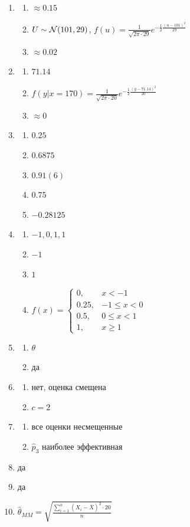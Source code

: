 \begin{enumerate}
\item
\begin{enumerate}
\item $\approx 0.15$
\item $U \sim \mathcal{N}(101,29)$, $f(u) = \frac{1}{\sqrt{2\pi\cdot 29}}e^{-\frac{1}{2}\frac{(u-101)^2}{29}}$
\item $\approx 0.02$
\end{enumerate}
\item
\begin{enumerate}
\item $71.14$
\item $f(y|x=170) = \frac{1}{\sqrt{2\pi\cdot20}}e^{-\frac{1}{2}\frac{(y-71.14)^2}{20}}$
\item $\approx 0$
\end{enumerate}
\item
\begin{enumerate}
\item $0.25$
\item $0.6875$
\item $0.91(6)$
\item $0.75$
\item $-0.28125$
\end{enumerate}
\item
\begin{enumerate}
\item $-1, 0, 1, 1$
\item $-1$
\item $1$
\item $f(x) = \begin{cases}
0, & x < -1 \\
0.25, & -1 \leq x < 0 \\
0.5, & 0 \leq x < 1 \\
1, & x \geq 1
\end{cases}$
\end{enumerate}
\item
\begin{enumerate}
\item $\theta$
\item да
\end{enumerate}

\item
\begin{enumerate}
\item нет, оценка смещена
\item $c = 2$
\end{enumerate}
\item
\begin{enumerate}
\item все оценки несмещенные
\item $\hat{p}_3$ наиболее эффективная
\end{enumerate}
\item да
\item да
\item $\hat{\theta}_{MM} = \sqrt{\frac{\sum_{i=1}^n(X_i-\overline{X})^2\cdot20}{n}}$


\end{enumerate}
